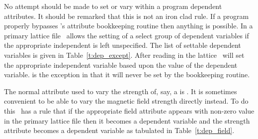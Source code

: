 No attempt should be made to set or vary within a program dependent
attributes. It should be remarked that this is not an iron clad rule.
If a program properly bypasses \bmad's attribute bookkeeping routine
then anything is possible. In a primary lattice file \bmad\ allows the
setting of a select group of dependent variables if the appropriate
independent is left unspecified.  The list of settable dependent
variables is given in Table~\ref{t:dep_except}.  After reading in the
lattice \bmad\ will set the appropriate independent variable based
upon the value of the dependent variable.  is the exception in 
that it will never be set by the bookkeeping routine.
\begin{table}[h]
\caption {Dependent variables that can be set in a primary lattice file.}
\label{t:dep_except}
\end{table}




The normal attribute used to vary the strength of, say, a
 is .  It is sometimes convenient to be able to
vary the magnetic field strength directly instead. To do this \bmad\ has
a rule that if the appropriate field attribute appears with non-zero value in the
primary lattice file then it becomes a dependent variable and the strength attribute
becomes a dependent variable as tabulated in Table~\ref{t:dep_field}.
\begin{table}[h]
\caption {Field and Strength Attributes.}
\label{t:dep_field}
\end{table}

